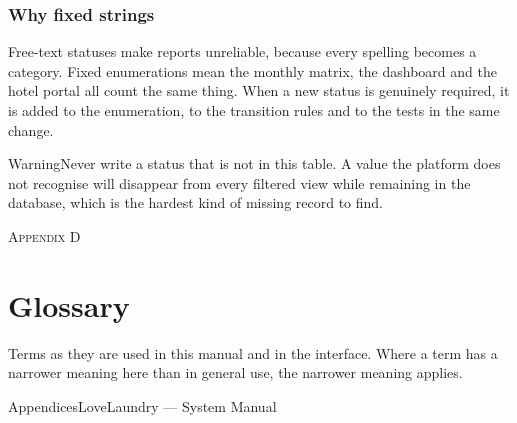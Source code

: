 \documentclass[11pt,a4paper,oneside]{book}
\begin{document}
\subsubsection*{Why fixed strings}
Free-text statuses make reports unreliable, because every spelling becomes a category. Fixed enumerations mean the monthly matrix, the dashboard and the hotel portal all count the same thing. When a new status is genuinely required, it is added to the enumeration, to the transition rules and to the tests in the same change.

\begin{notebox}WarningNever write a status that is not in this table. A value the platform does not recognise will disappear from every filtered view while remaining in the database, which is the hardest kind of missing record to find.\end{notebox}
\textsc{\small\color{crimson}Appendix D}\par\medskip
\section*{Glossary}
Terms as they are used in this manual and in the interface. Where a term has a narrower meaning here than in general use, the narrower meaning applies.

AppendicesLoveLaundry — System Manual
\end{document}
